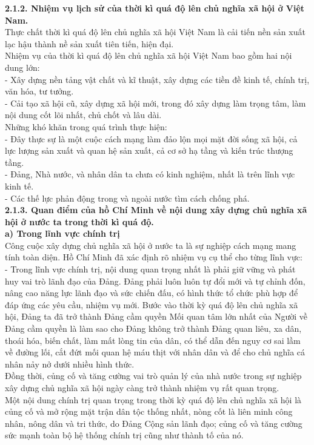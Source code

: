 \documentclass[12pt,a4paper]{article}
\begin{document}
\textbf{2.1.2. Nhiệm vụ lịch sử của thời kì quá độ lên chủ nghĩa xã hội ở Việt Nam.}\\Thực chất thời kì quá độ lên chủ nghĩa xã hội Việt Nam là cải tiến nền sản xuất lạc hậu thành nề sản xuất tiên tiến, hiện đại.\\
Nhiệm vụ của thời kì quá độ lên chủ nghĩa xã hội Việt Nam bao gồm hai nội dung lớn:\\
- Xây dựng nền tảng vật chất và kĩ thuật, xây dựng các tiền đề kinh tế, chính trị, văn hóa, tư tưởng.\\
- Cải tạo xã hội cũ, xây dựng xã hội mới, trong đó xây dựng làm trọng tâm, làm nội dung cốt lõi nhất, chủ chốt và lâu dài.\\
Những khó khăn trong quá trình thực hiện:\\
- Đây thực sự là một cuộc cách mạng làm đảo lộn mọi mặt đời sống xã hội, cả lực lượng sản xuất và quan hệ sản xuất, cả cơ sở hạ tầng và kiến trúc thượng tầng.\\
- Đảng, Nhà nước, và nhân dân ta chưa có kinh nghiệm, nhất là trên lĩnh vực kinh tế. \\
- Các thế lực phản động trong và ngoài nước tìm cách chống phá.\\[0.5cm]
\textbf{2.1.3. Quan điểm của hồ Chí Minh về nội dung xây dựng chủ nghĩa xã hội ở nước ta trong thời kì quá độ.}\\
\textbf{a) Trong lĩnh vực chính trị}\\
Công cuộc xây dựng chủ nghĩa xã hội ở nước ta là sự nghiệp cách mạng mang tính toàn diện. Hồ Chí Minh đã xác định rõ nhiệm vụ cụ thể cho từng lĩnh vực:\\[0.5cm]
- Trong lĩnh vực chính trị, nội dung quan trọng nhất là phải giữ vững và phát huy vai trò lãnh đạo của Đảng. Đảng phải luôn luôn tự đổi mới và tự chỉnh đốn, nâng cao năng lực lãnh đạo và sức chiến đấu, có hình thức tổ chức phù hợp để đáp ứng các yêu cầu, nhiệm vụ mới. Bước vào thời kỳ quá độ lên chủ nghĩa xã hội, Đảng ta đã trở thành Đảng cầm quyền Mối quan tâm lớn nhất của Người về Đảng cầm quyền là làm sao cho Đảng không trở thành Đảng quan liêu, xa dân, thoái hóa, biến chất, làm mất lòng tin của dân, có thể dẫn đến nguy cơ sai lầm về đường lối, cắt đứt mối quan hệ máu thịt với nhân dân và để cho chủ nghĩa cá nhân nảy nở dưới nhiều hình thức.\\
Đồng thời, củng cố  và tăng cường vai trò quản lý của nhà nước trong sự nghiệp xây dựng chủ nghĩa xã hội ngày càng trở thành nhiệm vụ rất quan trọng.\\
Một nội dung chính trị quan trọng trong thời kỳ quá độ lên chủ nghĩa xã hội là củng cố và mở rộng mặt trận dân tộc thống nhất, nòng cốt là liên minh công nhân, nông dân và tri thức, do Đảng Cộng sản lãnh đạo; củng cố và tăng cường sức mạnh toàn bộ hệ thống chính trị cũng như thành tố của nó.\\[0.5cm]
\end{document}
